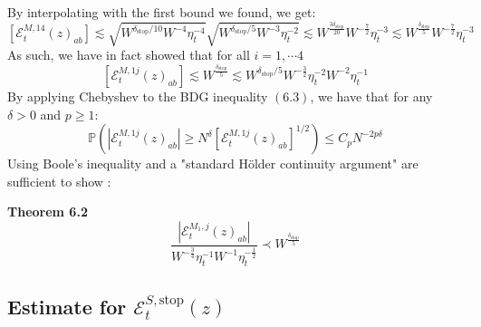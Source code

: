 \documentclass[11pt]{article}
\newenvironment{boxtheorem}[1]
  {\begin{mdframed}\noindent\textbf{#1}\itshape\space}
  {\end{mdframed}}
\newcommand{\E}{\mathcal{E}}
\newcommand{\sto}{\text{stop}}
\begin{document}
\noindent By interpolating with the first bound we found, we get: 
$$\left[\E_t^{M, 14}(z)_{ab}\right] \lesssim \sqrt{ W^{\delta_\sto/10}W^{-4}\eta_t^{-4}}\sqrt{W^{\delta_\sto/5}W^{-3}\eta_t^{-2}}\lesssim W^{\frac{3\delta_\sto}{20}}W^{-\frac{7}{2}}\eta_t^{-3}\lesssim W^{\frac{\delta_\sto}{5}}W^{-\frac{7}{2}}\eta_t^{-3}$$
As such, we have in fact showed that for all $i=1, \cdots 4$ $$[\E_t^{M, 1j}(z)_{ab}]\lesssim W^{\frac{\delta_\sto}{5}}\lesssim W^{\delta_\sto/5}W^{-\frac{3}{2}}\eta_t^{-2}W^{-2}\eta_t^{-1}$$
By applying Chebyshev to the BDG inequality $(6.3)$, we have that for any $\delta>0$ and $p\geq 1$: 
\begin{equation*}\mathbb{P}\left(\left\vert \E_t^{M, 1j}(z)_{ab}\right\vert\geq N^\delta [\E_t^{M, 1j}(z)_{ab}]^{1/2}\right)\leq C_p N^{-2p\delta}\tag{6.5}\end{equation*}
Using Boole's inequality and a "standard Hölder continuity argument"  are sufficient to show \cite{bandSDE}:
\begin{boxtheorem}{Theorem 6.2}
$$\frac{\left\vert \E_t^{M_1, j}(z)_{ab}\right\vert}{W^{-\frac{3}{4}}\eta_t^{-1}W^{-1}\eta_t^{-\frac{1}{2}}}\prec W^{\frac{\delta_\sto}{5}}$$
\end{boxtheorem}



\subsection{Estimate for $\E_t^{S, \text{stop}}(z)$}
\end{document}

